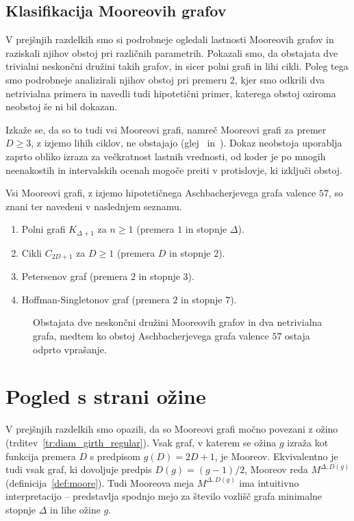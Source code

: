 \documentclass[fin1, tisk]{fmfdelo}
\begin{document}
\subsection{Klasifikacija Mooreovih grafov}
V prejšnjih razdelkih smo si podrobneje ogledali lastnosti Mooreovih grafov in raz\-iska\-li njihov obstoj
pri različnih parametrih. Pokazali smo, da obstajata dve trivialni neskončni družini takih grafov, in sicer
polni grafi in lihi cikli. Poleg tega smo podrobneje analizirali njihov obstoj pri premeru $2$, kjer smo odkrili dva 
netrivialna primera in navedli tudi hipotetični primer, katerega obstoj oziroma neobstoj še ni bil dokazan.

Izkaže se, da so to tudi vsi Mooreovi grafi, namreč Mooreovi grafi za 
premer $D \geq 3$, z izjemo lihih ciklov, ne obstajajo (glej~\cite{bannai1973finite} in~\cite{hoffman1960moore}). Dokaz neobstoja
uporablja zaprto obliko izraza za večkratnost lastnih vrednosti, od koder je po mnogih neenakostih in intervalskih ocenah mogoče preiti v protislovje, 
ki izključi obstoj.

\begin{izrek}\label{iz:moore_klasifikacija}
    Vsi Mooreovi grafi, z izjemo hipotetičnega Aschbacherjevega grafa valence $57$,
    so znani ter navedeni v naslednjem seznamu.
    \begin{enumerate}[label=(\roman*)]
        \item Polni grafi $K_{\Delta+1}$ za $n \geq 1$ (premera $1$ in stopnje $\Delta$).
        \item Cikli $C_{2D+1}$ za $D \geq 1$ (premera $D$ in stopnje $2$).
        \item Petersenov graf (premera $2$ in stopnje $3$).
        \item Hoffman-Singletonov graf (premera $2$ in stopnje $7$).
    \end{enumerate}
\end{izrek}


\begin{figure}[ht]
    \centering
    \def\svgwidth{\columnwidth}
    \caption{Obstajata dve neskončni družini Mooreovih grafov in dva netrivialna grafa, 
    medtem ko obstoj Aschbacherjevega grafa valence $57$ ostaja odprto vprašanje.}
\end{figure}

\newpage
\section{Pogled s strani ožine}
V prejšnjih razdelkih smo opazili, da so Mooreovi grafi močno 
povezani z ožino (trditev~\ref{tr:diam_girth_regular}). 
Vsak graf, v katerem se ožina $g$ izraža kot funkcija premera $D$ s predpisom $g(D) = 2D+1$,
je Mooreov. Ekvivalentno je tudi vsak graf, ki dovoljuje predpis $D(g) = (g-1)/{2}$, Mooreov
reda $M^{\Delta, D(g)}$ (definicija~\ref{def:moore}). Tudi Mooreova meja $M^{\Delta, D(g)}$ ima
intuitivno interpretacijo -- predstavlja spodnjo mejo za število vozlišč grafa 
minimalne stopnje $\Delta$ in lihe ožine $g$.
\end{document}
